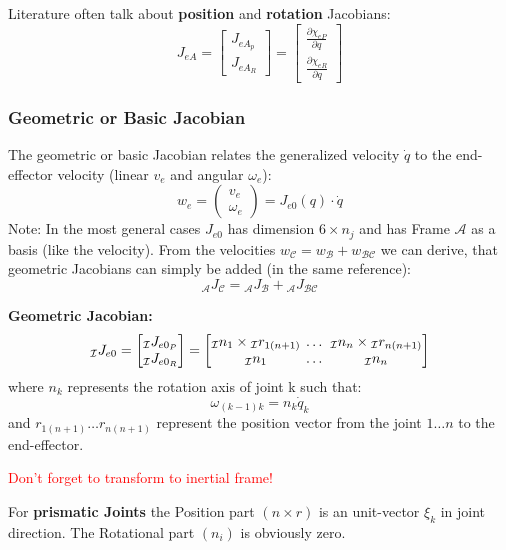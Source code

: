 \documentclass[fontsize=6pt,DIV=calc,a4paper,ngerman]{scrartcl}
\begin{document}
\begin{multicols*}{4}
	Literature often talk about \textbf{position} and \textbf{rotation} Jacobians:
	$$J_{eA} = \begin{bmatrix}
			J_{eA_p} \\ J_{eA_R}
		\end{bmatrix}
		= \begin{bmatrix}
			\frac{\partial \chi_{eP}}{\partial q} \\
			\frac{\partial \chi_{eR}}{\partial q}
		\end{bmatrix}
	$$
	\subsubsection{Geometric or Basic Jacobian}
	The geometric or basic Jacobian relates the generalized velocity $\dot{q}$ to the end-effector velocity (linear $v_e$ and angular $\omega_e$):
	$$w_e = \begin{pmatrix}v_e \\ \omega_e\end{pmatrix} = J_{e0}(q)\cdot \dot{q}$$
	Note: In the most general cases $J_{e0}$ has dimension $6\times n_j$ and has Frame $\mathcal{A}$ as a basis (like the velocity).
	From the velocities $w_\mathcal{C} = w_\mathcal{B} + w_\mathcal{BC}$ we can derive, that geometric Jacobians can simply be added (in the same reference):
	$${}_\mathcal{A}J_\mathcal{C} = {}_\mathcal{A}J_\mathcal{B} +{}_\mathcal{A}J_\mathcal{BC}$$

	\smallskip
	\textbf{Geometric Jacobian:}
	$$ {}_\mathcal{I}J_{e0} =
		\begin{bmatrix}{}
			{}_\mathcal{I}J_{e0_P} \\ {}_\mathcal{I}J_{e0_R}
		\end{bmatrix}
		=
		\setlength\arraycolsep{2pt}
		\begin{bmatrix}{}
			{}_\mathcal{I}n_1 \times {}_\mathcal{I}r_{1(n+1)} & \dots & {}_\mathcal{I}n_n \times {}_\mathcal{I}r_{n(n+1)} \\
			{}_\mathcal{I}n_1                                 & \dots & {}_\mathcal{I}n_n
		\end{bmatrix}$$
	where $n_k$ represents the rotation axis of joint k such that: $$\omega_{(k-1)k} = n_k \dot{q}_k$$
	and $r_{1(n+1)} \dots r_{n(n+1)}$ represent the position vector from the joint $1 \dots n$ to the end-effector.

	\textcolor{red}{Don't forget to transform to inertial frame!}

	\smallskip
	For \textbf{prismatic Joints}  the Position part $(n\times r)$ is an unit-vector $\xi_k$ in joint direction. The Rotational part $(n_i)$ is obviously zero.


\end{multicols*}
\end{document}
